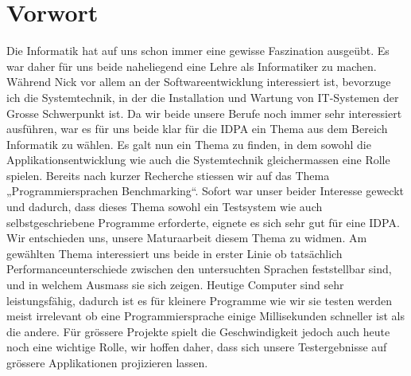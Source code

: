 \documentclass{fancydocument}
\begin{document}

\section{Vorwort}

Die Informatik hat auf uns schon immer eine gewisse Faszination ausgeübt. Es war daher für uns beide naheliegend eine Lehre als Informatiker zu machen. Während Nick vor allem an der Softwareentwicklung interessiert ist, bevorzuge ich die Systemtechnik, in der die Installation und Wartung von IT-Systemen der Grosse Schwerpunkt ist.
Da wir beide unsere Berufe noch immer sehr interessiert ausführen, war es für uns beide klar für die IDPA ein Thema aus dem Bereich Informatik zu wählen. Es galt nun ein Thema zu finden, in dem sowohl die Applikationsentwicklung wie auch die Systemtechnik gleichermassen eine Rolle spielen. Bereits nach kurzer Recherche stiessen wir auf das Thema „Programmiersprachen Benchmarking“. Sofort war unser beider Interesse geweckt und dadurch,  dass dieses Thema sowohl ein Testsystem wie auch selbstgeschriebene Programme erforderte, eignete es sich sehr gut für eine IDPA. Wir entschieden uns, unsere Maturaarbeit diesem Thema zu widmen.
Am gewählten Thema interessiert uns beide in erster Linie ob tatsächlich Performanceunterschiede zwischen den untersuchten Sprachen feststellbar sind, und in welchem Ausmass sie sich zeigen. Heutige Computer sind sehr leistungsfähig, dadurch ist es für kleinere Programme wie wir sie testen werden meist irrelevant ob eine Programmiersprache einige Millisekunden schneller ist als die andere. Für grössere Projekte spielt die Geschwindigkeit jedoch auch heute noch eine wichtige Rolle, wir hoffen daher, dass sich unsere Testergebnisse auf grössere Applikationen projizieren lassen.
\end{document}
